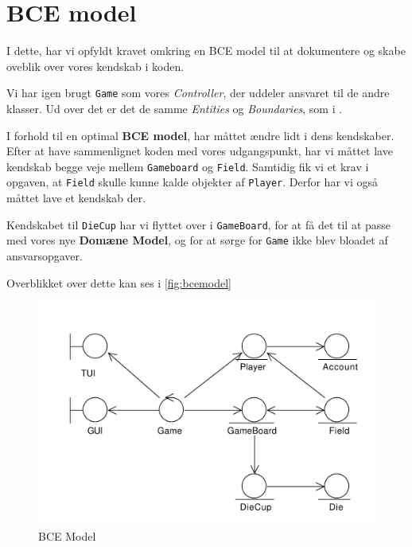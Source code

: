 \section{BCE model}
I dette, har vi opfyldt kravet omkring en BCE model til at dokumentere og skabe oveblik over vores kendskab i koden.


Vi har igen brugt \texttt{Game} som vores \textit{Controller}, der uddeler ansvaret til de andre klasser. Ud over det er det de samme \textit{Entities} og \textit{Boundaries}, som i \citep{19del2}.

I forhold til en optimal \textbf{BCE model}, har måttet ændre lidt i dens kendskaber. Efter at have sammenlignet koden med vores udgangspunkt, har vi måttet lave kendskab begge veje mellem \texttt{Gameboard} og \texttt{Field}. Samtidig fik vi et krav i opgaven, at \texttt{Field} skulle kunne kalde objekter af \texttt{Player}. Derfor har vi også måttet lave et kendskab der.

Kendskabet til \texttt{DieCup} har vi flyttet over i \texttt{GameBoard}, for at få det til at passe med vores nye \textbf{Domæne Model}, og for at sørge for \texttt{Game} ikke blev bloadet af ansvarsopgaver.

Overblikket over dette kan ses i \vref{fig:bcemodel}

\begin{figure}[ht]
\centering
\includegraphics[width=1\textwidth]{BCEModel.pdf}
\caption[<Text for the list of figures>]{BCE Model}
\label{fig:bcemodel}
\end{figure}